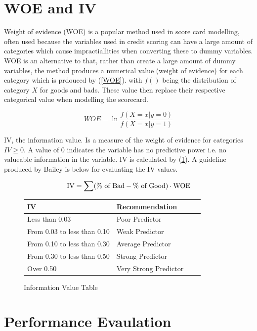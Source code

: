 \section{WOE and IV}
Weight of evidence (WOE) is a popular method used in score card modelling, often used because the variables used in credit scoring can have a large amount of categories which cause impractiallities when converting these to dummy variables. WOE is an alternative to that, rather than create a large amount of dummy variables, the method produces a numerical value (weight of evidence) for each category which is prdouced by (\ref{WOE}). with $f()$ being the distribution of category $X$ for goods and bads. These value then replace their respective categorical value when modelling the scorecard.

\begin{equation}\label{WOE}
WOE = \ln \frac{f(X=x|y=0)}{f(X=x|y=1)}
\end{equation}

IV, the information value. Is a measure of the weight of evidence for categories $IV \geq 0$. A value of 0 indicates the variable has no predictive power i.e. no valueable information in the variable. IV is calculated by (\ref{IV}). A guideline produced by Bailey\cite{bailey2004credit} is below for evaluating the IV values.

\begin{equation}\label{IV}
\textup{IV} = \sum (\% \textup{ of Bad} - \% \textup{ of Good}) \cdot \textup{WOE}
\end{equation}

\begin{figure}[H]
	\centering
	\begin{tabular}{l l l l}
	IV	&Recommendation \\
	\hline
	Less than 0.03			&Poor Predictor \\
	From 0.03 to less than 0.10	&Weak Predictor \\
	From 0.10 to less than 0.30	&Average Predictor \\
	From 0.30 to less than 0.50	&Strong Predictor \\
	Over 0.50				&Very Strong Predictor \\
	\end{tabular}
	\caption{Information Value Table \label{IV}}\cite{bailey2004credit}
\end{figure}

\section{Performance Evaulation}

